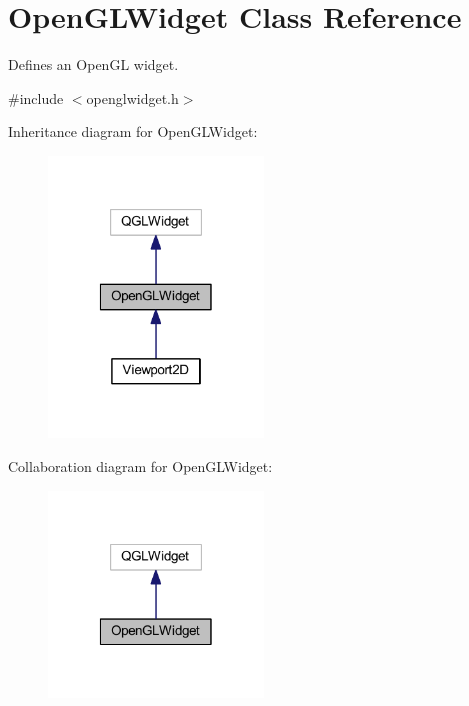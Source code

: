 \hypertarget{class_open_g_l_widget}{\section{Open\-G\-L\-Widget Class Reference}
\label{class_open_g_l_widget}
}


Defines an Open\-G\-L widget.  




{\ttfamily \#include $<$openglwidget.\-h$>$}



Inheritance diagram for Open\-G\-L\-Widget\-:
\nopagebreak
\begin{figure}[H]
\begin{center}
\leavevmode
\includegraphics[width=162pt]{class_open_g_l_widget__inherit__graph}
\end{center}
\end{figure}


Collaboration diagram for Open\-G\-L\-Widget\-:
\nopagebreak
\begin{figure}[H]
\begin{center}
\leavevmode
\includegraphics[width=162pt]{class_open_g_l_widget__coll__graph}
\end{center}
\end{figure}
